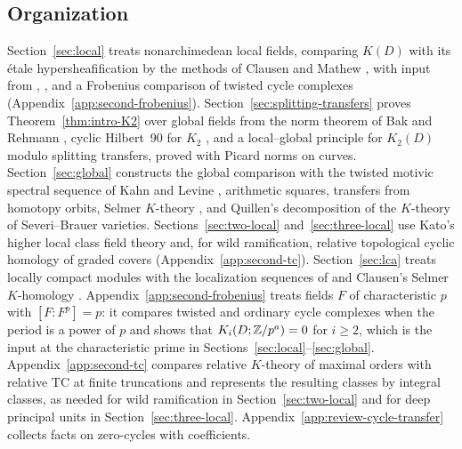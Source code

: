 \subsection*{Organization}

Section~\ref{sec:local} treats nonarchimedean local fields, comparing $K(D)$ with its \'etale hypersheafification by the methods of Clausen and Mathew \cite{ClausenMathew}, with input from \cite{SuslinYufryakov}, \cite{HesselholtLarsenLindenstrauss2020}, and a Frobenius comparison of twisted cycle complexes (Appendix~\ref{app:second-frobenius}).
Section~\ref{sec:splitting-transfers} proves Theorem~\ref{thm:intro-K2} over global fields from the norm theorem of Bak and Rehmann \cite{BakRehmann1984}, cyclic Hilbert~90 for $K_2$ \cite[Theorem 14.1]{MerkurjevSuslin1982}, and a local--global principle for $K_2(D)$ modulo splitting transfers, proved with Picard norms on curves.
Section~\ref{sec:global} constructs the global comparison with the twisted motivic spectral sequence of Kahn and Levine \cite{KahnLevine2010}, arithmetic squares, transfers from homotopy orbits, Selmer $K$-theory \cite{ClausenMathew}, and Quillen's decomposition of the $K$-theory of Severi--Brauer varieties.
Sections~\ref{sec:two-local} and~\ref{sec:three-local} use Kato's higher local class field theory \cite{KatoExistence,KatoLocalII,Kurihara2000} and, for wild ramification, relative topological cyclic homology of graded covers (Appendix~\ref{app:second-tc}).
Section~\ref{sec:lca} treats locally compact modules with the localization sequences of \cite{BHRAdeles} and Clausen's Selmer $K$-homology \cite{ClausenArtin}.
Appendix~\ref{app:second-frobenius} treats fields $F$ of characteristic $p$ with $[F:F^p]=p$: it compares twisted and ordinary cycle complexes when the period is a power of $p$ and shows that $K_i(D;\mathbb Z/p^a)=0$ for $i\ge2$, which is the input at the characteristic prime in Sections~\ref{sec:local}--\ref{sec:global}.
Appendix~\ref{app:second-tc} compares relative $K$-theory of maximal orders with relative $\mathrm{TC}$ at finite truncations and represents the resulting classes by integral classes, as needed for wild ramification in Section~\ref{sec:two-local} and for deep principal units in Section~\ref{sec:three-local}.
Appendix~\ref{app:review-cycle-transfer} collects facts on zero-cycles with coefficients.
